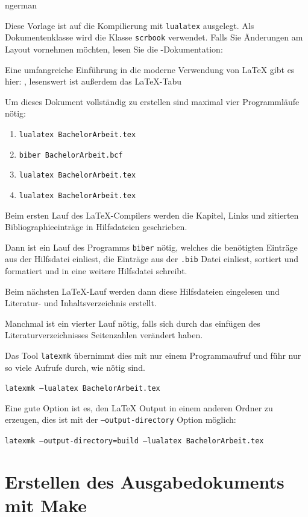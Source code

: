 \begin{foreignlanguage}{ngerman}

Diese Vorlage ist auf die Kompilierung mit \texttt{lualatex} ausgelegt. 
Als Dokumentenklasse  wird die \KOMAScript\-Klasse \texttt{scrbook} verwendet.
Falls Sie Änderungen am Layout vornehmen möchten, lesen Sie die \KOMAScript-Dokumentation: 

Eine umfangreiche Einführung in die moderne Verwendung von \LaTeX{} gibt es hier: , lesenswert ist außerdem das \LaTeX-Tabu

Um dieses Dokument vollständig zu erstellen sind maximal vier Programmläufe nötig:
\begin{enumerate}[nosep]
    \item \texttt{lualatex BachelorArbeit.tex}
    \item \texttt{biber BachelorArbeit.bcf}
    \item \texttt{lualatex BachelorArbeit.tex}
    \item \texttt{lualatex BachelorArbeit.tex}
\end{enumerate}

Beim ersten Lauf des \LaTeX-Compilers werden die Kapitel, Links und zitierten Bibliographieeinträge in Hilfsdateien geschrieben.

Dann ist ein Lauf des Programms \texttt{biber} nötig, welches die benötigten Einträge aus der Hilfsdatei einliest, die Einträge aus der \texttt{.bib} Datei einliest, sortiert und formatiert und in eine weitere Hilfsdatei schreibt.

Beim nächsten \LaTeX-Lauf werden dann diese Hilfsdateien eingelesen und Literatur- und Inhaltsverzeichnis erstellt.

Manchmal ist ein vierter Lauf nötig, falls sich durch das einfügen des Literaturverzeichnisses Seitenzahlen verändert haben.

Das Tool \texttt{latexmk} übernimmt dies mit nur einem Programmaufruf und
führ nur so viele Aufrufe durch, wie nötig sind.

\texttt{latexmk --lualatex BachelorArbeit.tex}

Eine gute Option ist es, den \LaTeX{} Output in einem anderen 
Ordner zu erzeugen, dies ist mit der \texttt{--output-directory} Option möglich:

\texttt{latexmk --output-directory=build --lualatex BachelorArbeit.tex}


\section{Erstellen des Ausgabedokuments mit Make}


\end{foreignlanguage}
